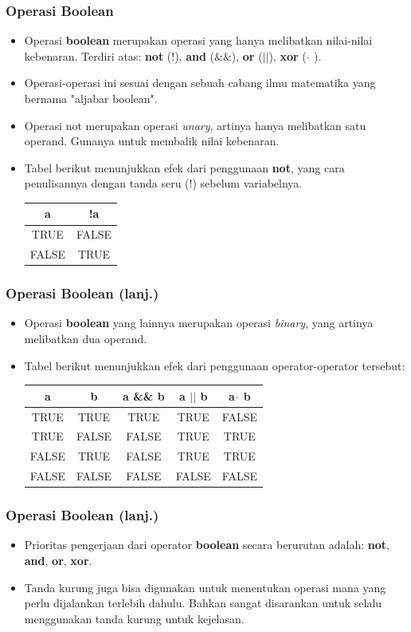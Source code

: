 \begin{frame}
\frametitle{Operasi Boolean}
\begin{itemize}
  \item Operasi \textbf{boolean} merupakan operasi yang hanya melibatkan nilai-nilai kebenaran. Terdiri atas: \textbf{not} (!), \textbf{and} ($\&\&$), \textbf{or} ($||$), \textbf{xor} ( $\widehat{}$ ).
  \item Operasi-operasi ini sesuai dengan sebuah cabang ilmu matematika yang bernama "aljabar boolean".
  \item Operasi \alert{not} merupakan operasi \textit{unary}, artinya hanya melibatkan satu operand. Gunanya untuk membalik nilai kebenaran.
  \item Tabel berikut menunjukkan efek dari penggunaan \textbf{not}, yang cara penulisannya dengan tanda seru (!) sebelum variabelnya.
  \begin{tabular}{|c|c|}
  \hline a & !a \\
  \hline TRUE & FALSE \\
  \hline FALSE & TRUE \\
  \hline
  \end{tabular}
\end{itemize}
\end{frame}

\begin{frame}
\frametitle{Operasi Boolean (lanj.)}
\begin{itemize}
  \item Operasi \textbf{boolean} yang lainnya merupakan operasi \textit{binary}, yang artinya melibatkan dua operand.
  \item Tabel berikut menunjukkan efek dari penggunaan operator-operator tersebut:
  \begin{tabular}{|c|c|c|c|c|}
  \hline a & b & a \&\& b & a $||$ b & a $\widehat{}$ b \\
  \hline TRUE & TRUE & TRUE & TRUE & FALSE \\
  \hline TRUE & FALSE & FALSE & TRUE & TRUE \\
  \hline FALSE & TRUE & FALSE & TRUE & TRUE\\
  \hline FALSE & FALSE & FALSE & FALSE & FALSE \\
  \hline
  \end{tabular}
\end{itemize}
\end{frame}

\begin{frame}
\frametitle{Operasi Boolean (lanj.)}
\begin{itemize}
  \item Prioritas pengerjaan dari operator \textbf{boolean} secara berurutan adalah: \textbf{not}, \textbf{and}, \textbf{or}, \textbf{xor}.
  \item Tanda kurung juga bisa digunakan untuk menentukan operasi mana yang perlu dijalankan terlebih dahulu. Bahkan sangat disarankan untuk selalu menggunakan tanda kurung untuk kejelasan.
\end{itemize}
\end{frame}

